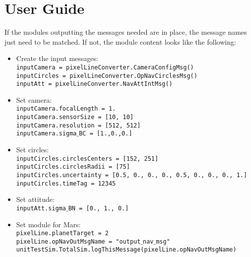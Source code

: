 
\section{User Guide}
If the modules outputting the messages needed are in place, the message names just need to be matched. If not, the module content looks like the following:

\begin{itemize}
\item Create the input messages: \\
\texttt{inputCamera = pixelLineConverter.CameraConfigMsg()} \\
\texttt{inputCircles = pixelLineConverter.OpNavCirclesMsg()}\\
\texttt{inputAtt = pixelLineConverter.NavAttIntMsg()}\\
\item Set camera: \\
\texttt{inputCamera.focalLength = 1.}\\
\texttt{inputCamera.sensorSize = [10, 10]}\\
\texttt{inputCamera.resolution = [512, 512]}\\
\texttt{inputCamera.sigma$\_$BC = [1.,0.,0.]}\\
\item Set circles: \\
\texttt{inputCircles.circlesCenters = [152, 251]}\\
\texttt{inputCircles.circlesRadii = [75]}\\
\texttt{inputCircles.uncertainty = [0.5, 0., 0., 0., 0.5, 0., 0., 0., 1.]}\\
\texttt{inputCircles.timeTag = 12345}\\
\item Set attitude: \\
\texttt{inputAtt.sigma$\_$BN = [0., 1., 0.]}\\
\item Set module for Mars: \\
\texttt{pixelLine.planetTarget = 2}\\
\texttt{pixelLine.opNavOutMsgName = "output$\_$nav$\_$msg"}\\
\texttt{unitTestSim.TotalSim.logThisMessage(pixelLine.opNavOutMsgName)}\\
  \end{itemize}